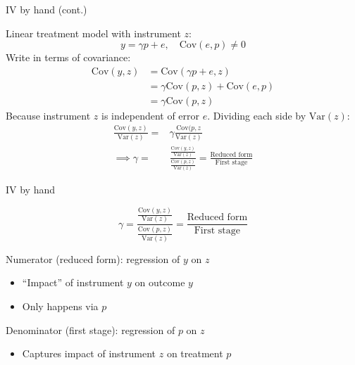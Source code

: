 \documentclass[compress, 8pt]{beamer}
\begin{document}
\begin{frame}{IV by hand (cont.)}

Linear treatment model with instrument $z$:
\begin{equation*}
    y = \gamma p + e, \quad \text{Cov} (e, p) \neq 0
\end{equation*}
Write in terms of covariance:
\begin{align*}
    \text{Cov} (y, z) &= \text{Cov} (\gamma p + e, z) \\
    &= \gamma \text{Cov} (p, z) + \text{Cov} (e, p) \\
    &= \gamma \text{Cov} (p, z)
\end{align*}
Because instrument $z$ is independent of error $e$. Dividing each side by $\text{Var} (z)$:
\begin{align*}
    \frac{\text{Cov} (y, z)}{\text{Var} (z)} =& \gamma \frac{\text{Cov} (p, z}{\text{Var} (z)} \\
    \implies \gamma =& \frac{\frac{\text{Cov} (y, z)}{\text{Var} (z)}}{\frac{\text{Cov} (p, z)}{\text{Var} (z)}}
    = \frac{\text{Reduced form}}{\text{First stage}}
\end{align*}

\end{frame}

\begin{frame}{IV by hand}

\begin{equation*}
    \gamma = \frac{\frac{\text{Cov} (y, z)}{\text{Var} (z)}}{\frac{\text{Cov} (p, z)}{\text{Var} (z)}}
    = \frac{\text{Reduced form}}{\text{First stage}}
\end{equation*}

Numerator (reduced form): regression of $y$ on $z$
\begin{itemize}
    \item ``Impact'' of instrument $y$ on outcome $y$
    \item Only happens via $p$
\end{itemize}
Denominator (first stage): regression of $p$ on $z$
\begin{itemize}
    \item Captures impact of instrument $z$ on treatment $p$
\end{itemize}



\end{frame}
\end{document}
